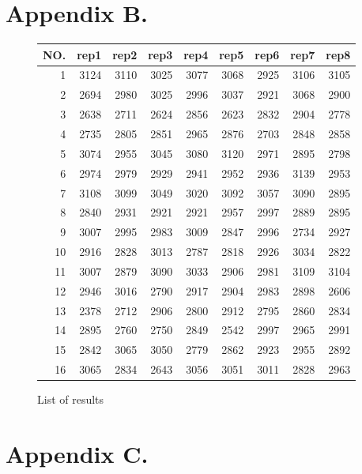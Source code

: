 \chapter{Appendix B.}

\begin{figure}[ht]
	\label{table:appendix:hyperparameter_tuning:final_taguchi}
	\centering
	\begin{tabular}{ rrrrrrrrr }
		\hline
		NO.& rep1 & rep2 & rep3 & rep4 & rep5 & rep6 & rep7 & rep8\\
		\hline
		1 & 3124 & 3110 & 3025 & 3077 & 3068 & 2925 & 3106 & 3105 \\ 
		2 & 2694 & 2980 & 3025 & 2996 & 3037 & 2921 & 3068 & 2900 \\ 
		3 & 2638 & 2711 & 2624 & 2856 & 2623 & 2832 & 2904 & 2778 \\ 
		4 & 2735 & 2805 & 2851 & 2965 & 2876 & 2703 & 2848 & 2858 \\ 
		5 & 3074 & 2955 & 3045 & 3080 & 3120 & 2971 & 2895 & 2798 \\ 
		6 & 2974 & 2979 & 2929 & 2941 & 2952 & 2936 & 3139 & 2953 \\ 
		7 & 3108 & 3099 & 3049 & 3020 & 3092 & 3057 & 3090 & 2895 \\ 
		8 & 2840 & 2931 & 2921 & 2921 & 2957 & 2997 & 2889 & 2895 \\ 
		9 & 3007 & 2995 & 2983 & 3009 & 2847 & 2996 & 2734 & 2927 \\ 
		10 & 2916 & 2828 & 3013 & 2787 & 2818 & 2926 & 3034 & 2822 \\ 
		11 & 3007 & 2879 & 3090 & 3033 & 2906 & 2981 & 3109 & 3104 \\ 
		12 & 2946 & 3016 & 2790 & 2917 & 2904 & 2983 & 2898 & 2606 \\ 
		13 & 2378 & 2712 & 2906 & 2800 & 2912 & 2795 & 2860 & 2834 \\ 
		14 & 2895 & 2760 & 2750 & 2849 & 2542 & 2997 & 2965 & 2991 \\ 
		15 & 2842 & 3065 & 3050 & 2779 & 2862 & 2923 & 2955 & 2892 \\ 
		16 & 3065 & 2834 & 2643 & 3056 & 3051 & 3011 & 2828 & 2963 \\ 
		\hline
	\end{tabular}
	\caption{List of results}

\end{figure}


\chapter{Appendix C.}

